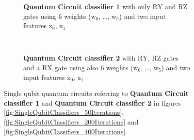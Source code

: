 \begin{figure}[h!]
    \centering

    \begin{subfigure}{1.0\textwidth}
        \centering
        \caption{\textbf{Quantum Circuit classifier 1} with only $\mathrm{RY}$ and $\mathrm{RZ}$ gates using 6 weights ($\mathrm{w_0}$, …, $\mathrm{w_5}$) and two input features $\mathrm{x_0}$, $\mathrm{x_1}$ }
        \label{fig:single_qubit_circuit_1}
    \end{subfigure}
    \\[2ex]
    \begin{subfigure}{1.0\textwidth}
        \centering
        \caption{\textbf{Quantum Circuit classifier 2} with $\mathrm{RY}$, $\mathrm{RZ}$ gates and a $\mathrm{RX}$ gate using also 6 weights ($\mathrm{w_0}$, …, $\mathrm{w_5}$) and two input features $\mathrm{x_0}$, $\mathrm{x_1}$ }
        \label{fig:single_qubit_circuit_2}
    \end{subfigure}
    
    \caption{Single qubit quantum circuits referring to \textbf{Quantum Circuit classifier 1} and \textbf{Quantum Circuit classifier 2} in figures \ref{fig:SingleQubitClassifiers_50Iterations}, \ref{fig:SingleQubitClassifiers_200Iterations} and \ref{fig:SingleQubitClassifiers_400Iterations}.}
    \label{fig:single_qubit_circuits}
\end{figure}

